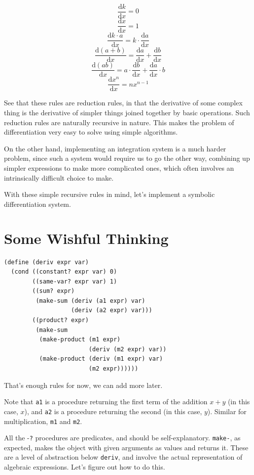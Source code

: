 \documentclass[9pt]{report}
\begin{document}
$$\frac{\mathrm{d}k}{\mathrm{d}x} = 0$$
$$\frac{\mathrm{d}x}{\mathrm{d}x} = 1$$
$$\frac{\mathrm{d}k\cdot a}{\mathrm{d}x} = k\cdot \frac{\mathrm{d}a}{\mathrm{d}x}$$
$$\frac{\mathrm{d}(a+b)}{\mathrm{d}x} =
   \frac{\mathrm{d}a}{\mathrm{d}x} + \frac{\mathrm{d}b}{\mathrm{d}x}$$
$$\frac{\mathrm{d}(ab)}{\mathrm{d}x} =  a\cdot
   \frac{\mathrm{d}b}{\mathrm{d}x} +
   \frac{\mathrm{d}a}{\mathrm{d}x}\cdot b$$
$$\frac{\mathrm{d}x^{n}}{\mathrm{d}x} = nx^{n-1}$$

See that these rules are reduction rules, in that the derivative of
some complex thing is the derivative of simpler things joined
together by basic operations. Such reduction rules are naturally
recursive in nature. This makes the problem of differentiation very
easy to solve using simple algorithms.

On the other hand, implementing an integration system is a much
harder problem, since such a system would require us to go the
other way, combining up simpler expressions to make more
complicated ones, which often involves an intrinsically difficult
choice to make.

With these simple recursive rules in mind, let's implement a
symbolic differentiation system.

\section{Some Wishful Thinking}
\label{sec:org4ee1658}

\begin{verbatim}
(define (deriv expr var)
  (cond ((constant? expr var) 0)
        ((same-var? expr var) 1)
        ((sum? expr)
         (make-sum (deriv (a1 expr) var)
                   (deriv (a2 expr) var)))
        ((product? expr)
         (make-sum
          (make-product (m1 expr)
                        (deriv (m2 expr) var))
          (make-product (deriv (m1 expr) var)
                        (m2 expr))))))
\end{verbatim}


That's enough rules for now, we can add more later.

Note that \texttt{a1} is a procedure returning the first term of the
addition \(x+y\) (in this case, \(x\)), and \texttt{a2} is a procedure
returning the second (in this case, \(y\)). Similar for
multiplication, \texttt{m1} and \texttt{m2}.

All the -\texttt{?} procedures are predicates, and should be
self-explanatory. \texttt{make-}, as expected, makes the object with given
arguments as values and returns it. These are a level of
abstraction below \texttt{deriv}, and involve the actual representation of
algebraic expressions. Let's figure out how to do this.
\end{document}
